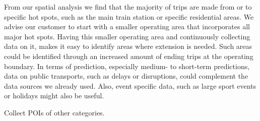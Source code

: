 From our spatial analysis we find that the majority of trips are made from or to specific hot spots, such as the main train station or specific residential areas. 
We advise our customer to start with a smaller operating area that incorporates all major hot spots.
Having this smaller operating area and continuously collecting data on it, makes it easy to identify areas where extension is needed. Such areas could be identified through an increased amount of ending trips at the operating boundary.
In terms of prediction, especially medium- to short-term predictions, data on public transports, such as delays or disruptions, could complement the data sources we already used.
Also, event specific data, such as large sport events or holidays might also be useful.




Collect POIs of other categories.